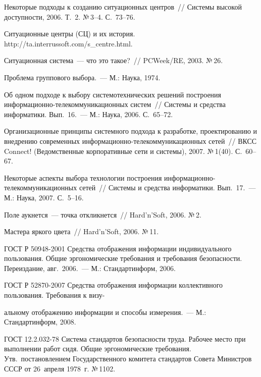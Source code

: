 \begin{multicols}{2}
{{\begin{thebibliography}{99}
Некоторые подходы к созданию ситуационных центров~// Системы 
высокой доступности, 2006. Т.~2. №\,3--4. С.~73--76.

Ситуационные центры (СЦ) и их история. {\sf  
http://\linebreak ta.interrussoft.com/s\_centre.html}.

Ситуационная система~--- что это такое?~// PCWeek/RE, 2003. №\,26. 

Проблема группового выбора.~--- М.: Наука, 1974.

Об одном подходе к выбору системотехнических решений построения 
ин\-фор\-ма\-ци\-он\-но-те\-ле\-ком\-му\-ни\-ка\-ци\-он\-ных систем~// Системы и средства 
информатики. Вып.~16.~--- М.: Наука, 2006. С.~65--72.

Организационные принципы сис\-тем\-но\-го подхода к разработке, 
проектированию и внедрению современных информационно-те\-ле\-ком\-му\-ни\-ка\-ци\-он\-ных сетей~// 
ВКСС Connect! (Ведомственные 
корпоративные сети и системы), 2007. №\,1(40). С.~60--67.

Некоторые аспекты выбора технологии построения 
информационно-телекоммуникационных сетей~// Системы и средства 
информатики. Вып.~17.~--- М.: Наука, 2007. С.~5--16.

Поле аукнется~--- точка откликнется~// Hard'n'Soft, 2006. №\,2.

Мастера яркого цвета~// Hard'n'Soft, 2006. №\,11.

ГОСТ Р 50948-2001 Средства отображения информации индивидуального 
пользования. Общие эргономические требования и требования 
безопасности. Переиздание, авг.\ 2006.~--- М.: Стандартинформ, 2006.

ГОСТ Р 52870-2007 Средства отображения информации коллективного 
пользования. Требования к визу-\linebreak\vspace*{-12pt}
\pagebreak

\noindent
альному отображению информации и 
способы измерения.~--- М.: Стандартинформ, 2008.

ГОСТ 12.2.032-78 Система стандартов безопасности труда. Рабочее место 
при выполнении работ сидя. Общие эргономические требования. Утв.\ 
по\-ста\-нов\-ле\-ни\-ем Государственного комитета стандартов Совета 
Министров СССР от 26~апреля 1978~г. №\,1102. 




\end{thebibliography}}}
\end{multicols}
